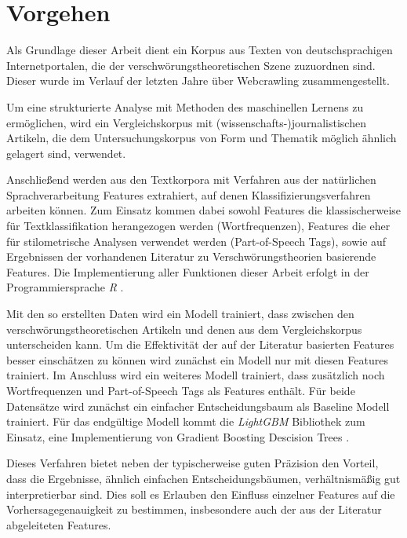 \section{Vorgehen}

Als Grundlage dieser Arbeit dient ein Korpus aus Texten von deutschsprachigen Internetportalen, die der verschwörungstheoretischen Szene zuzuordnen sind.
Dieser wurde im Verlauf der letzten Jahre über Webcrawling zusammengestellt.

Um eine strukturierte Analyse mit Methoden des maschinellen Lernens zu ermöglichen, wird ein Vergleichskorpus mit (wissenschafts-)journalistischen Artikeln, die dem Untersuchungskorpus von Form und Thematik möglich ähnlich gelagert sind, verwendet.

Anschließend werden aus den Textkorpora mit Verfahren aus der natürlichen Sprachverarbeitung Features extrahiert, auf denen Klassifizierungsverfahren arbeiten können.
Zum Einsatz kommen dabei sowohl Features die klassischerweise für Textklassifikation herangezogen werden (Wortfrequenzen), Features die eher für stilometrische Analysen verwendet werden (Part-of-Speech Tags), sowie auf Ergebnissen der vorhandenen Literatur zu Verschwörungstheorien basierende Features.
Die Implementierung aller Funktionen dieser Arbeit erfolgt in der Programmiersprache \textit{R} \parencite{r_2021}.

Mit den so erstellten Daten wird ein Modell trainiert, dass zwischen den verschwörungstheoretischen Artikeln und denen aus dem Vergleichskorpus unterscheiden kann.
Um die Effektivität der auf der Literatur basierten Features besser einschätzen zu können wird zunächst ein Modell nur mit diesen Features trainiert.
Im Anschluss wird ein weiteres Modell trainiert, dass zusätzlich noch Wortfrequenzen und Part-of-Speech Tags als Features enthält.
Für beide Datensätze wird zunächst ein einfacher Entscheidungsbaum als Baseline Modell trainiert.
Für das endgültige Modell kommt die \textit{LightGBM} Bibliothek \parencite[][]{lightgbm} zum Einsatz, eine Implementierung von Gradient Boosting Descision Trees \parencite{friedman_2002}.

Dieses Verfahren bietet neben der typischerweise guten Präzision den Vorteil, dass die Ergebnisse, ähnlich einfachen Entscheidungsbäumen, verhältnismäßig gut interpretierbar sind.
Dies soll es Erlauben den Einfluss einzelner Features auf die Vorhersagegenauigkeit zu bestimmen, insbesondere auch der aus der Literatur abgeleiteten Features.